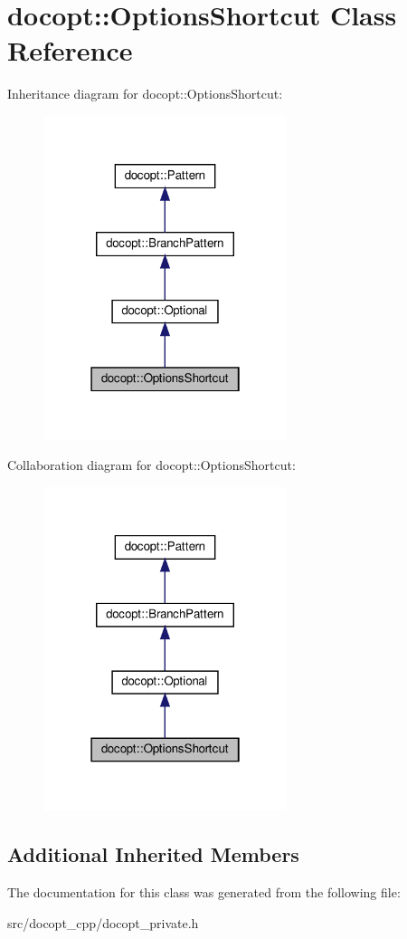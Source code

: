 \hypertarget{classdocopt_1_1OptionsShortcut}{}\section{docopt\+:\+:Options\+Shortcut Class Reference}
\label{classdocopt_1_1OptionsShortcut}


Inheritance diagram for docopt\+:\+:Options\+Shortcut\+:
\nopagebreak
\begin{figure}[H]
\begin{center}
\leavevmode
\includegraphics[width=202pt]{classdocopt_1_1OptionsShortcut__inherit__graph}
\end{center}
\end{figure}


Collaboration diagram for docopt\+:\+:Options\+Shortcut\+:
\nopagebreak
\begin{figure}[H]
\begin{center}
\leavevmode
\includegraphics[width=202pt]{classdocopt_1_1OptionsShortcut__coll__graph}
\end{center}
\end{figure}
\subsection*{Additional Inherited Members}


The documentation for this class was generated from the following file\+:\begin{DoxyCompactItemize}
\item 
src/docopt\+\_\+cpp/docopt\+\_\+private.\+h\end{DoxyCompactItemize}

